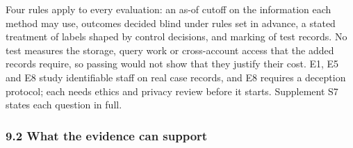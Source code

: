 \documentclass[
  11pt,
]{article}
\begin{document}
Four rules apply to every evaluation: an as-of cutoff on the information
each method may use, outcomes decided blind under rules set in advance,
a stated treatment of labels shaped by control decisions, and marking of
test records. No test measures the storage, query work or cross-account
access that the added records require, so passing would not show that
they justify their cost. E1, E5 and E8 study identifiable staff on real
case records, and E8 requires a deception protocol; each needs ethics
and privacy review before it starts. Supplement S7 states each question
in full.

\hypertarget{what-the-evidence-can-support}{%
\subsubsection{9.2 What the evidence can
support}\label{what-the-evidence-can-support}}
\end{document}
